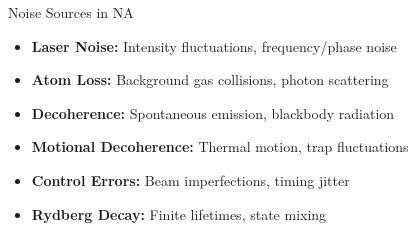 \begin{frame}{Noise Sources in NA}
    \begin{itemize}
        \item \textbf{Laser Noise:} Intensity fluctuations, frequency/phase noise
        \item \textbf{Atom Loss:} Background gas collisions, photon scattering
        \item \textbf{Decoherence:} Spontaneous emission, blackbody radiation
        \item \textbf{Motional Decoherence:} Thermal motion, trap fluctuations
        \item \textbf{Control Errors:} Beam imperfections, timing jitter
        \item \textbf{Rydberg Decay:} Finite lifetimes, state mixing
    \end{itemize}
\end{frame}


